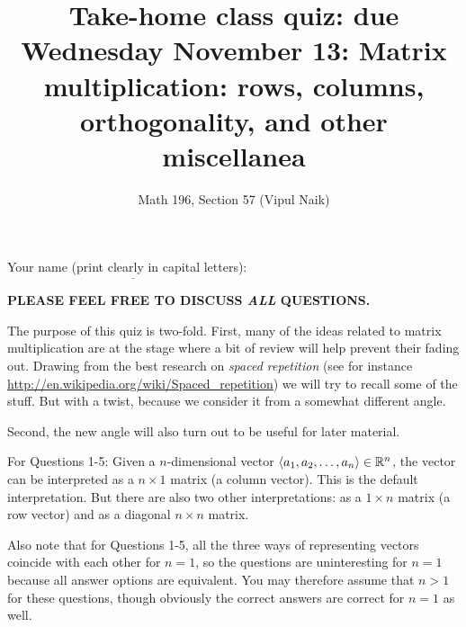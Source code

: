 \documentclass[10pt]{amsart}
\title{Take-home class quiz: due Wednesday November 13: Matrix multiplication: rows, columns, orthogonality, and other miscellanea}
\author{Math 196, Section 57 (Vipul Naik)}
\begin{document}
\maketitle

Your name (print clearly in capital letters): $\underline{\qquad\qquad\qquad\qquad\qquad\qquad\qquad\qquad\qquad\qquad}$

{\bf PLEASE FEEL FREE TO DISCUSS {\em ALL} QUESTIONS.}

The purpose of this quiz is two-fold. First, many of the ideas related
to matrix multiplication are at the stage where a bit of review will
help prevent their fading out. Drawing from the best research on {\em
  spaced repetition} (see for instance
\url{http://en.wikipedia.org/wiki/Spaced_repetition}) we will try to
recall some of the stuff. But with a twist, because we consider it
from a somewhat different angle.

Second, the new angle will also turn out to be useful for later
material.

For Questions 1-5: Given a $n$-dimensional vector $\langle
a_1,a_2,\dots,a_n \rangle \in \mathbb{R}^n$, the vector can be interpreted as
a $n \times 1$ matrix (a column vector). This is the default
interpretation. But there are also two other interpretations: as a $1
\times n$ matrix (a row vector) and as a diagonal $n \times n$ matrix.

Also note that for Questions 1-5, all the three ways of representing
vectors coincide with each other for $n = 1$, so the questions are
uninteresting for $n = 1$ because all answer options are
equivalent. You may therefore assume that $n > 1$ for these questions,
though obviously the correct answers are correct for $n = 1$ as well.
\end{document}
